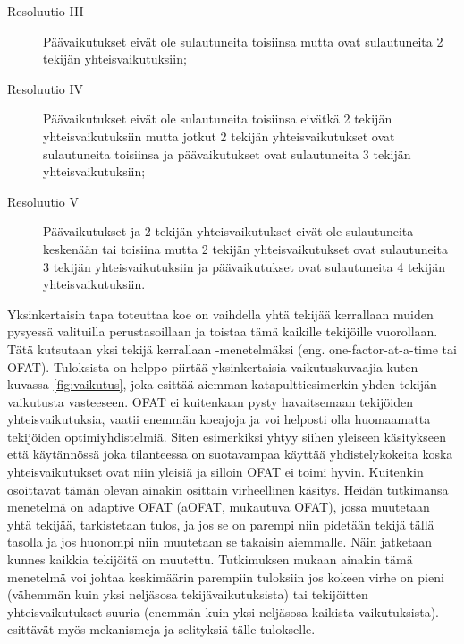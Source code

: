 \documentclass[12pt,a4paper,finnish]{tutthesis}
\begin{document}
\begin{description}
\item[Resoluutio III] Päävaikutukset eivät ole sulautuneita toisiinsa
mutta ovat sulautuneita 2 tekijän yhteisvaikutuksiin;
\item[Resoluutio IV] Päävaikutukset eivät ole sulautuneita toisiinsa eivätkä 2 tekijän
yhteisvaikutuksiin mutta jotkut 2 tekijän yhteisvaikutukset ovat sulautuneita toisiinsa
ja päävaikutukset ovat sulautuneita 3 tekijän yhteisvaikutuksiin;
\item[Resoluutio V] Päävaikutukset ja 2 tekijän yhteisvaikutukset eivät ole sulautuneita
keskenään tai toisiina mutta 2 tekijän yhteisvaikutukset ovat sulautuneita 3 tekijän
yhteisvaikutuksiin ja päävaikutukset ovat sulautuneita 4 tekijän yhteisvaikutuksiin. \parencite[s.~9]{montgomery2006}
\end{description}




Yksinkertaisin tapa toteuttaa koe on vaihdella yhtä tekijää kerrallaan
muiden pysyessä valituilla perustasoillaan ja toistaa
tämä kaikille tekijöille vuorollaan. Tätä kutsutaan
yksi tekijä kerrallaan -menetelmäksi
(eng. one-factor-at-a-time tai OFAT).
Tuloksista on helppo piirtää yksinkertaisia vaikutuskuvaajia
kuten kuvassa \ref{fig:vaikutus}, joka esittää aiemman katapulttiesimerkin yhden tekijän vaikutusta vasteeseen.
OFAT ei kuitenkaan pysty havaitsemaan
tekijöiden yhteisvaikutuksia,
vaatii enemmän koeajoja
ja voi helposti olla huomaamatta tekijöiden optimiyhdistelmiä.
Siten esimerkiksi \textcite{Montgomery2012}
yhtyy siihen yleiseen käsitykseen että käytännössä joka tilanteessa on
suotavampaa käyttää yhdistelykokeita koska yhteisvaikutukset
ovat niin yleisiä ja silloin OFAT ei toimi hyvin.
Kuitenkin \textcite{frey2005mechanisms} osoittavat tämän
olevan ainakin osittain virheellinen käsitys. Heidän tutkimansa
menetelmä on adaptive OFAT (aOFAT, mukautuva OFAT), jossa muutetaan
yhtä tekijää, tarkistetaan tulos, ja jos se on parempi niin
pidetään tekijä tällä tasolla ja jos huonompi niin muutetaan se
takaisin aiemmalle. Näin jatketaan kunnes kaikkia tekijöitä on
muutettu. Tutkimuksen mukaan ainakin tämä menetelmä voi
johtaa keskimäärin parempiin tuloksiin jos kokeen virhe on
pieni (vähemmän kuin yksi neljäsosa tekijävaikutuksista) tai
tekijöitten yhteisvaikutukset suuria (enemmän kuin yksi neljäsosa
kaikista vaikutuksista). \textcite{frey2005mechanisms} esittävät
myös mekanismeja ja selityksiä tälle tulokselle.
\end{document}
